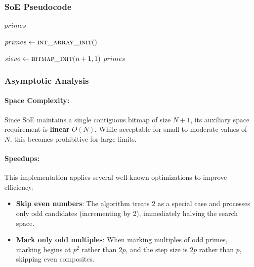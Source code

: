 \documentclass{article}
\begin{document}
\subsubsection*{SoE Pseudocode}
\begin{algorithm}[H]
    \caption{SoE — Sieve of Eratosthenes}
    \begin{algorithmic}[1]   
         
        \Ensure $primes$ 
             
        \State {}
        \State {} $primes \gets \Call{int\_array\_init}$ 

        \State {} $sieve \gets \Call{bitmap\_init}{n + 1, 1}$ 
        \State {} 
        \State \Return $primes$ 
    \end{algorithmic}
\end{algorithm}

\subsubsection*{Asymptotic Analysis}

\paragraph{Space Complexity:} Since SoE maintains a single contiguous bitmap of size $N+1$, its auxiliary space requirement is \textbf{linear} $O(N)$. While acceptable for small to moderate values of $N$, this becomes prohibitive for large limits.

\paragraph{Speedups:}
This implementation applies several well-known optimizations to improve efficiency:
\begin{itemize}[noitemsep]
    \item \textbf{Skip even numbers}: The algorithm treats 2 as a special case and processes only odd candidates (incrementing by 2), immediately halving the search space.
    \item \textbf{Mark only odd multiples}: When marking multiples of odd primes, marking begins at $p^2$ rather than $2p$, and the step size is $2p$ rather than $p$, skipping even composites.
\end{itemize}
\end{document}
